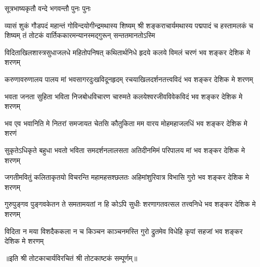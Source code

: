 

%
{सूत्रभाष्यकृतौ वन्दे भगवन्तौ पुनः पुनः}%

%
{व्यासं शुकं गौडपदं महान्तं गोविन्दयोगीन्द्रमथास्य शिष्यम्}%
{श्री शङ्कराचार्यमथास्य पद्मपादं च हस्तामलकं च शिष्यम्}%
{तं तोटकं वार्तिककारमन्यानस्मद्गुरून् सन्ततमानतोऽस्मि}%

\twolineshloka
{विदिताखिलशास्त्रसुधाजलधे महितोपनिषत् कथितार्थनिधे}%
{हृदये कलये विमलं चरणं भव शङ्कर देशिक मे शरणम्}%


\twolineshloka
{करुणावरुणालय पालय मां भवसागरदुःखविदूनहृदम्}%
{रचयाखिलदर्शनतत्त्वविदं भव शङ्कर देशिक मे शरणम्}%


\twolineshloka
{भवता जनता सुहिता भविता निजबोधविचारण चारुमते}%
{कलयेश्वरजीवविवेकविदं भव शङ्कर देशिक मे शरणम्}%


\twolineshloka
{भव एव भवानिति मे नितरां समजायत चेतसि कौतुकिता}%
{मम वारय मोहमहाजलधिं भव शङ्कर देशिक मे शरणं }%


\twolineshloka
{सुकृतेऽधिकृते बहुधा भवतो भविता समदर्शनलालसता}%
{अतिदीनमिमं परिपालय मां भव शङ्कर देशिक मे शरणम्}%


\twolineshloka
{जगतीमवितुं कलिताकृतयो विचरन्ति महामहसश्छलतः}%
{अहिमांशुरिवात्र विभासि गुरो भव शङ्कर देशिक मे शरणम्}%


\twolineshloka
{गुरुपुङ्गव पुङ्गवकेतन ते समतामयतां न हि कोऽपि सुधीः}%
{शरणागतवत्सल तत्त्वनिधे भव शङ्कर देशिक मे शरणम्}%


\twolineshloka
{विदिता न मया विशदैककला न च किञ्चन काञ्चनमस्ति गुरो}%
{द्रुतमेव विधेहि कृपां सहजां भव शङ्कर देशिक मे शरणम्}%

॥इति श्री तोटकाचार्यविरचितं श्री तोटकाष्टकं सम्पूर्णम्॥